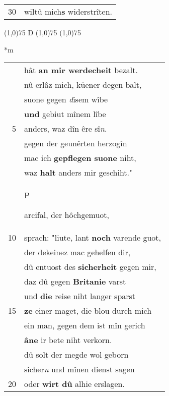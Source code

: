 \documentclass[8pt,a4paper,notitlepage]{article}
\begin{document}
\begin{table}[ht]
\begin{minipage}[t]{0.5\linewidth}
\begin{tabular}{rl}
30 & wiltû mich\textbf{s} widerstrîten.\\ 
\end{tabular}
\scriptsize
\line(1,0){75} \newline
D \newline
\line(1,0){75} \newline
\newline
\line(1,0){75} \newline
\newline
\end{minipage}
\hspace{0.5cm}
\begin{minipage}[t]{0.5\linewidth}
\small
\begin{center}*m
\end{center}
\begin{tabular}{rl}
 & hât \textbf{an mir werdecheit} bezalt.\\ 
 & nû erlâz mich, küener degen balt,\\ 
 & suone gegen \textit{d}isem wîbe\\ 
 & \textbf{und} gebiut mînem lîbe\\ 
5 & anders, waz dîn êre sî\textit{n}.\\ 
 & gegen der geunêrten herzogîn\\ 
 & mac ich \textbf{gepflegen suone} niht,\\ 
 & waz \textbf{halt} anders mir geschiht."\\ 
 & \begin{large}P\end{large}arcifal, der hôchgemuot,\\ 
10 & sprach: "liute, lant \textbf{noch} varende guot,\\ 
 & der dekeinez mac gehelfen dir,\\ 
 & dû entuost des \textbf{sicherheit} gegen mir,\\ 
 & daz dû gegen \textbf{Britanie} varst\\ 
 & und \textbf{die} reise niht langer sparst\\ 
15 & \textbf{ze} einer maget, die blou durch mich\\ 
 & ein man, gegen dem ist mîn gerich\\ 
 & \textbf{âne} ir bete niht verkorn.\\ 
 & dû solt der megde wol geborn\\ 
 & sicher\textit{n} und mînen dienst sagen\\ 
20 & oder \textbf{wirt dû} alhie erslagen.\\ 

\end{tabular}
\end{minipage}
\end{table}
\end{document}
